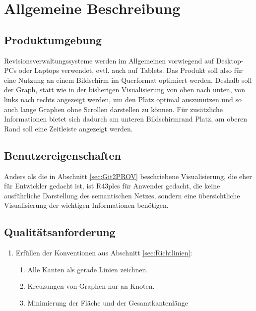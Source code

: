 \documentclass[nocolor]{tudbook}
\begin{document}
\section{Allgemeine Beschreibung}
\subsection{Produktumgebung}
Revisionsverwaltungssysteme werden im Allgemeinen vorwiegend auf Desktop-PCs oder Laptops verwendet, evtl. auch auf Tablets. Das Produkt soll also für eine Nutzung an einem Bildschirm im Querformat optimiert werden. Deshalb soll der Graph, statt wie in der bisherigen Visualisierung von oben nach unten, von links nach rechts angezeigt werden, um den Platz optimal auszunutzen und so auch lange Graphen ohne Scrollen darstellen zu können. Für zusätzliche Informationen bietet sich dadurch am unteren Bildschirmrand Platz, am oberen Rand soll eine Zeitleiste angezeigt werden.

\subsection{Benutzereigenschaften}
Anders als die in Abschnitt \ref{sec:Git2PROV} beschriebene Visualisierung, die eher für Entwickler gedacht ist, ist R43ples für Anwender gedacht, die keine ausführliche Darstellung des semantischen Netzes, sondern eine übersichtliche Visualisierung der wichtigen Informationen benötigen. 

\subsection{Qualitätsanforderung}
\begin{enumerate}[Q1]
\item Erfüllen der Konventionen aus Abschnitt \ref{sec:Richtlinien}:
	\begin{enumerate}[Q1.1]
		\item Alle Kanten als gerade Linien zeichnen.
		\item Kreuzungen von Graphen nur an Knoten.
		\item Minimierung der Fläche und der Gesamtkantenlänge
	\end{enumerate}
\end{enumerate}
\end{document}
